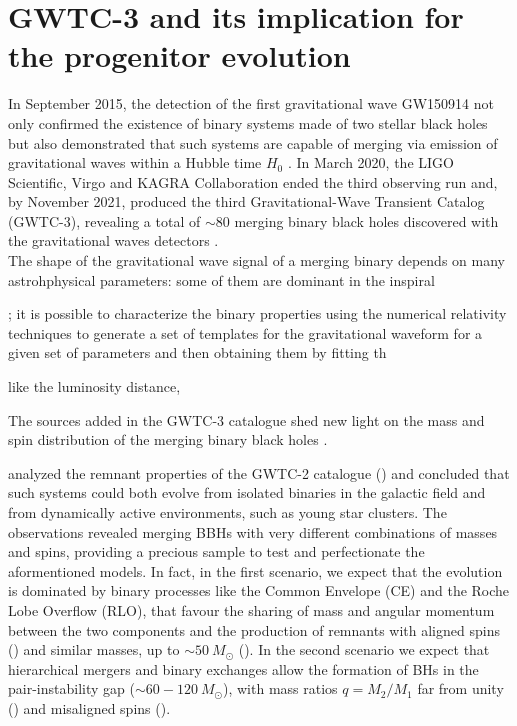 \documentclass[a4paper,titlepage]{book}     	%
\newcommand{\sun}{\ensuremath{_\odot}}
\newcommand{\msun}{\ensuremath{M\sun}}
\begin{document}
\section{GWTC-3 and its implication for the progenitor evolution}
In September 2015, the detection of the first gravitational wave GW150914 not only confirmed the existence of binary systems made of two stellar black holes but also demonstrated that such systems are capable of merging via emission of gravitational waves within a Hubble time $H_0$ \cite{Abbott2016firstGW}. In March 2020, the LIGO Scientific, Virgo and KAGRA Collaboration ended the third observing run and, by November 2021, produced the third Gravitational-Wave Transient Catalog (GWTC-3), revealing a total of $\sim 80$ merging binary black holes discovered with the gravitational waves detectors \cite{GWTC-3}.\\







The shape of the gravitational wave signal of a merging binary depends on many astrohphysical parameters: some of them are dominant in the inspiral



; it is possible to characterize the binary properties using the numerical relativity techniques to generate a set of templates for the gravitational waveform for a given set of parameters and then obtaining them by fitting th

 like the luminosity distance, 








The sources added in the GWTC-3 catalogue shed new light on the mass and spin distribution of the merging binary black holes \cite{GWTC-3_interpretation}. 




\cite{Abbot2021spectrumGW,HMXBH_spins2021} analyzed the remnant properties of the GWTC-2 catalogue (\cite{GWTC-2}) and concluded that such systems could both evolve from isolated binaries in the galactic field and from dynamically active environments, such as young star clusters. The observations revealed merging BBHs with very different combinations of masses and spins, providing a precious sample to test and perfectionate the aformentioned models. In fact, in the first scenario, we expect that the evolution is dominated by binary processes like the Common Envelope (CE) and the Roche Lobe Overflow (RLO), that favour the sharing of mass and angular momentum between the two components and the production of remnants with aligned spins (\cite{Kalogera2000_spinaligned}) and similar masses, up to $\sim 50~\msun$ (\cite{Giacobbo2018spectrum}). In the second scenario we expect that hierarchical mergers and binary exchanges allow the formation of BHs in the pair-instability gap ($\sim 60-120~\msun$), with mass ratios $q=M_2/M_1$ far from unity (\cite{Rastello2021_dynamics}) and misaligned spins (\cite{Rodriguez2016_BHspins}).
\end{document}
